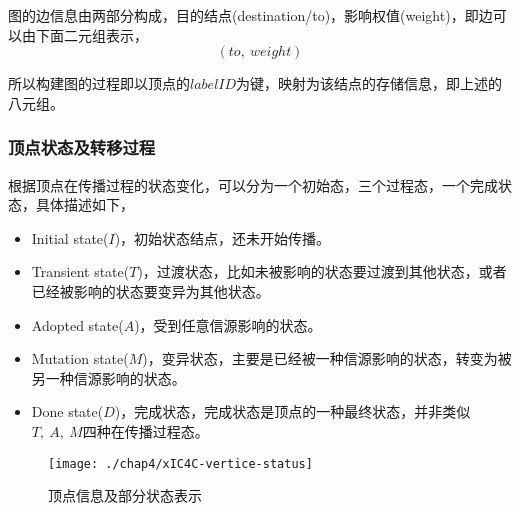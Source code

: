 图的边信息由两部分构成，目的结点(destination/to)，影响权值(weight)，即边可以由下面二元组表示，
\begin{displaymath}
(to, ~weight)
\end{displaymath}

所以构建图的过程即以顶点的$labelID$为键，映射为该结点的存储信息，即上述的八元组。

\subsubsection{顶点状态及转移过程}
根据顶点在传播过程的状态变化，可以分为一个初始态，三个过程态，一个完成状态，具体描述如下，
\begin{itemize}
\item Initial state($I$)，初始状态结点，还未开始传播。
\item Transient state($T$)，过渡状态，比如未被影响的状态要过渡到其他状态，或者已经被影响的状态要变异为其他状态。
\item Adopted state($A$)，受到任意信源影响的状态。
\item Mutation state($M$)，变异状态，主要是已经被一种信源影响的状态，转变为被另一种信源影响的状态。
\item Done state($D$)，完成状态，完成状态是顶点的一种最终状态，并非类似$T, ~A, ~M$四种在传播过程态。
\end{itemize}

\begin{figure}[H]
	\centering%
	\texttt{[image: ./chap4/xIC4C-vertice-status]}
	\caption{顶点信息及部分状态表示}
	\label{fig:chap4:vertice-status}
\end{figure}


